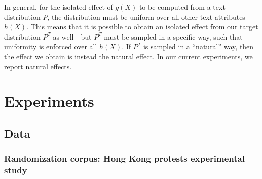 \documentclass{article}
\begin{document}
In general, for the isolated effect of $g(X)$ to be computed from a text distribution $P$, the distribution must be uniform over all other text attributes $h(X)$. This means that it is possible to obtain an isolated effect from our target distribution $P^T$ as well---but $P^T$ must be sampled in a specific way, such that uniformity is enforced over all $h(X)$. If $P^T$ is sampled in a ``natural'' way, then the effect we obtain is instead the natural effect. In our current experiments, we report natural effects.

\section{Experiments}

\subsection{Data}

\subsubsection{Randomization corpus: Hong Kong protests experimental study}
\end{document}

